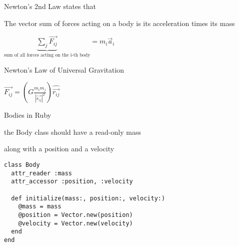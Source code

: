 \documentclass[bigger]{beamer}
\begin{document}
\begin{frame}[label=sec-23]{Newton's 2nd Law states that}
\begin{block}{The vector sum of forces acting on a body is its acceleration times its mass}
\begin{center}
{\LARGE $\underbrace{\sum_j\vec{F_{ij}}}_\text{sum of all forces acting on the i-th body} = m_i\vec{a}_i$ }
\end{center}
\end{block}
\end{frame}

\begin{frame}[label=sec-24]{Newton's Law of Universal Gravitation}
\begin{center}
\end{center}

\begin{center}
{\LARGE $\vec{F_{ij}} = \left(G \frac{m_i m_j}{ |\vec{r_{ij}}|^2 }\right)\hat{\vec{r_{ij}}}$ }
\end{center}
\end{frame}

\begin{frame}[fragile,label=sec-25]{Bodies in Ruby}
 \begin{block}{the Body class should have a read-only mass}
\end{block}
\begin{block}{along with a position and a velocity}
\begin{verbatim}
class Body
  attr_reader :mass
  attr_accessor :position, :velocity

  def initialize(mass:, position:, velocity:)
    @mass = mass
    @position = Vector.new(position)
    @velocity = Vector.new(velocity)
  end
end
\end{verbatim}
\end{block}
\end{frame}
\end{document}
